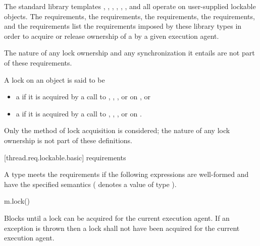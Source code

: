 \pnum
The standard library templates ,
,
,
, ,
, and
 all operate on user-supplied
lockable objects. The  requirements, the  requirements,
the  requirements,
the  requirements, and
the  requirements
list the requirements imposed by these library types
in order to acquire or release ownership of a  by a given execution agent.
\begin{note}
The nature of any lock ownership and any synchronization it entails are not part
of these requirements.
\end{note}

\pnum
A lock on an object  is said to be
\begin{itemize}
\item
a  if it is acquired by a call to
,
,
, or
 on , or
\item
a  if it is acquired by a call to
,
,
, or
 on .
\end{itemize}
\begin{note}
Only the method of lock acquisition is considered;
the nature of any lock ownership is not part of these definitions.
\end{note}

[thread.req.lockable.basic]{ requirements}

\pnum
A type  meets the  requirements if the following expressions are
well-formed and have the specified semantics ( denotes a value of type ).

\begin{itemdecl}
m.lock()
\end{itemdecl}

\begin{itemdescr}
\pnum
{}%
\effects
Blocks until a lock can be acquired for the current execution agent. If an exception
is thrown then a lock shall not have been acquired for the current execution agent.
\end{itemdescr}

